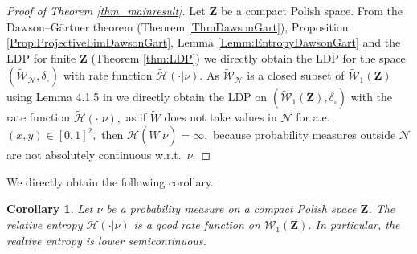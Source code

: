 \documentclass[12pt,twoside,a4paper]{article}
\newtheorem{corollary}{Corollary}[theorem]
\newcommand{\Space}{\mathbf{Z}}
\newcommand{\UGraphon}{\widetilde{\mathcal{W}}_1}
\begin{document}
\begin{proof}[Proof of Theorem \ref{thm_mainresult}]
Let $\Space$ be a compact Polish space. From the Dawson--G\"artner theorem (Theorem \ref{ThmDawsonGart}), Proposition \ref{Prop:ProjectiveLimDawsonGart}, Lemma \ref{Lemm:EntropyDawsonGart} and the LDP for finite $\Space$ (Theorem \ref{thm:LDP}) we directly obtain the LDP for the space $(\widetilde{\mathcal{W}}_{\mathcal{N}},\delta_{\square})$ with rate function $\widetilde{\mathcal{H}}(\cdot|\nu).$ As $\widetilde{\mathcal{W}}_{\mathcal{N}}$ is a closed subset of $\UGraphon(\Space)$ using Lemma 4.1.5 in \cite{dembo2009large} we directly obtain the LDP on $(\UGraphon(\Space),\delta_{\square})$ with the rate function $\widetilde{\mathcal{H}}(\cdot|\nu),$ as if $\widetilde{W}$ does not take values in $ \mathcal{N}$ for a.e.\ $(x,y)\in [0,1]^2,$ then  $\widetilde{\mathcal{H}}(\widetilde{W}|\nu)=\infty,$ because probability measures outside $ \mathcal{N}$ are not absolutely continuous w.r.t.\ $\nu.$
\end{proof}

We directly obtain the following corollary.
\begin{corollary}\label{cor:SemicontinuityFinal}
Let $\nu$ be a probability measure on a compact Polish space $\Space$. The relative entropy $\widetilde{\mathcal{H}}(\cdot| \nu)$ is a good rate function on $\UGraphon(\Space)$. In particular, the realtive entropy is lower semicontinuous.
\end{corollary}
\end{document}
